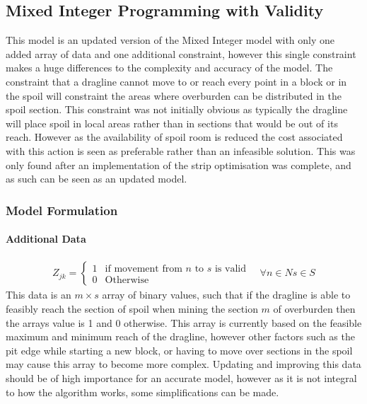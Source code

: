 \subsection{Mixed Integer Programming with Validity}
This model is an updated version of the Mixed Integer model with only one added array of data and one additional constraint, however this single constraint makes a huge differences to the complexity and accuracy of the model. The constraint that a dragline cannot move to or reach every point in a block or in the spoil will constraint the areas where overburden can be distributed in the spoil section. This constraint was not initially obvious as typically the dragline will place spoil in local areas rather than in sections that would be out of its reach. However as the availability of spoil room is reduced the cost associated with this action is seen as preferable rather than an infeasible solution. This was only found after an implementation of the strip optimisation was complete, and as such can be seen as an updated model. 
\subsubsection{Model Formulation}
\paragraph*{Additional Data}

\begin{align}
\label{MIP:Data Valid}
Z_{jk}  = \begin{cases} 1& \text{if movement from $n$ to $s$ is valid}\\
0 & \text{Otherwise}   \end{cases} 
\quad \forall n \in N s\in S
\end{align}
This data is an $m\times s$ array of binary values, such that if the dragline is able to feasibly reach the section of spoil when mining the section $m$ of overburden then the arrays value is 1 and 0 otherwise. This array is currently based on the feasible  maximum and minimum reach of the dragline, however other factors such as the pit edge while starting a new block, or having to move over sections in the spoil may cause this array to become more complex. Updating and improving this data should be of high importance for an accurate model, however as it is not integral to how the algorithm works, some simplifications can be made.
